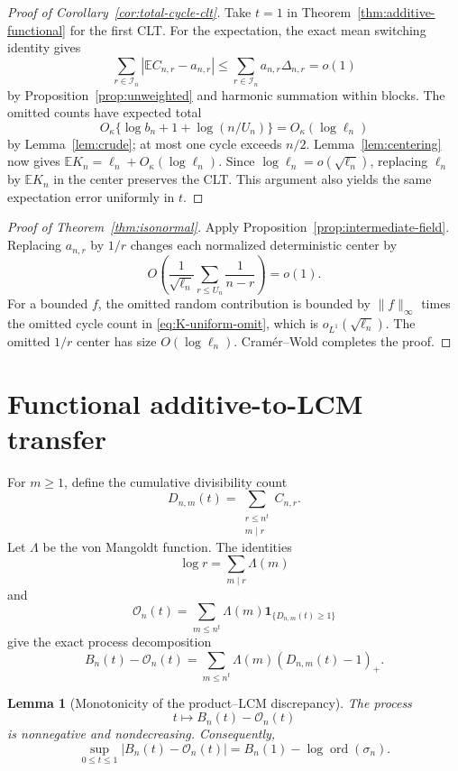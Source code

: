 \documentclass[11pt]{article}
\newtheorem{lemma}[theorem]{Lemma}
\theoremstyle{definition}
\theoremstyle{remark}
\newcommand{\Ee}{\mathbb E}
\newcommand{\one}{\mathbf 1}
\newcommand{\ord}{\operatorname{ord}}
\newcommand{\cO}{\mathcal O}
\newcommand{\cI}{\mathcal I}
\begin{document}
\begin{proof}[Proof of Corollary~\ref{cor:total-cycle-clt}]
Take $t=1$ in Theorem~\ref{thm:additive-functional} for the first CLT.
For the expectation, the exact mean switching identity gives
\[
 \sum_{r\in\cI_n}|\Ee C_{n,r}-a_{n,r}|
 \le\sum_{r\in\cI_n}a_{n,r}\Delta_{n,r}=o(1)
\]
by Proposition~\ref{prop:unweighted} and harmonic summation within blocks.
The omitted counts have expected total
\[
 O_\kappa\{\log b_n+1+\log(n/U_n)\}=O_\kappa(\log\ell_n)
\]
by Lemma~\ref{lem:crude}; at most one cycle exceeds $n/2$.
Lemma~\ref{lem:centering} now gives
$\Ee K_n=\ell_n+O_\kappa(\log\ell_n)$.
Since $\log\ell_n=o(\sqrt{\ell_n})$, replacing $\ell_n$ by
$\Ee K_n$ in the center preserves the CLT.
This argument also yields the same expectation error uniformly in $t$.
\end{proof}

\begin{proof}[Proof of Theorem~\ref{thm:isonormal}]
Apply Proposition~\ref{prop:intermediate-field}.  Replacing $a_{n,r}$ by
$1/r$ changes each normalized deterministic center by
\[
 O\left(\frac1{\sqrt{\ell_n}}\sum_{r\le U_n}\frac1{n-r}\right)=o(1).
\]
For a bounded $f$, the omitted random contribution is bounded by
$\|f\|_\infty$ times the omitted cycle count in
\eqref{eq:K-uniform-omit}, which is $o_{L^1}(\sqrt{\ell_n})$.  The omitted
$1/r$ center has size $O(\log\ell_n)$.  Cram\'er--Wold completes the proof.
\end{proof}

\section{Functional additive-to-LCM transfer}

For $m\ge1$, define the cumulative divisibility count
\begin{equation}\label{eq:Dmt}
 D_{n,m}(t)=\sum_{\substack{r\le n^t\\m\mid r}}C_{n,r}.
\end{equation}
Let $\Lambda$ be the von Mangoldt function.  The identities
\[
 \log r=\sum_{m\mid r}\Lambda(m)
\]
and
\[
 \cO_n(t)=\sum_{m\le n^t}\Lambda(m)
 \one_{\{D_{n,m}(t)\ge1\}}
\]
give the exact process decomposition
\begin{equation}\label{eq:process-vonmangoldt}
 B_n(t)-\cO_n(t)
 =\sum_{m\le n^t}\Lambda(m)(D_{n,m}(t)-1)_+.
\end{equation}

\begin{lemma}[Monotonicity of the product--LCM discrepancy]
\label{lem:monotone-discrepancy}
The process
\[
 t\longmapsto B_n(t)-\cO_n(t)
\]
is nonnegative and nondecreasing.  Consequently,
\begin{equation}\label{eq:sup-discrepancy}
 \sup_{0\le t\le1}|B_n(t)-\cO_n(t)|
 =B_n(1)-\log\ord(\sigma_n).
\end{equation}
\end{lemma}
\end{document}
